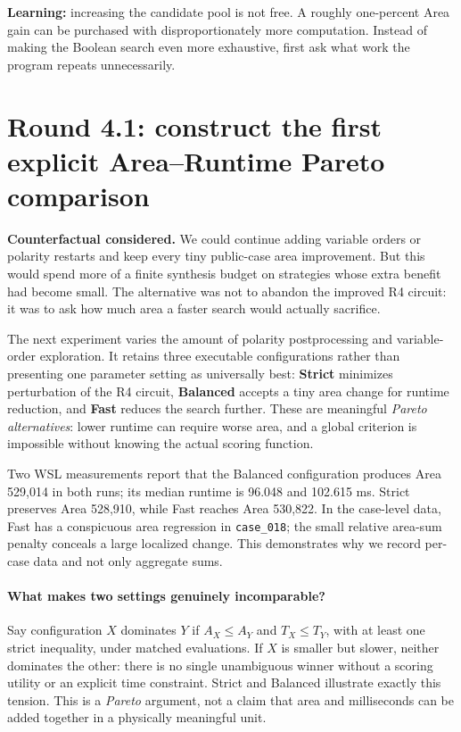\begin{tcolorbox}[colback=ResearchRose!20,colframe=ResearchRose,title=Decision after Round 4]
\textbf{Learning:} increasing the candidate pool is not free. A roughly one-percent Area gain can be purchased with disproportionately more computation. Instead of making the Boolean search even more exhaustive, first ask what work the program repeats unnecessarily.
\end{tcolorbox}

\section{Round 4.1: construct the first explicit Area--Runtime Pareto comparison}
\textbf{Counterfactual considered.} We could continue adding variable orders or polarity restarts and keep every tiny public-case area improvement. But this would spend more of a finite synthesis budget on strategies whose extra benefit had become small. The alternative was not to abandon the improved R4 circuit: it was to ask how much area a faster search would actually sacrifice.

The next experiment varies the amount of polarity postprocessing and variable-order exploration. It retains three executable configurations rather than presenting one parameter setting as universally best: \textbf{Strict} minimizes perturbation of the R4 circuit, \textbf{Balanced} accepts a tiny area change for runtime reduction, and \textbf{Fast} reduces the search further. These are meaningful \emph{Pareto alternatives}: lower runtime can require worse area, and a global criterion is impossible without knowing the actual scoring function.

Two WSL measurements report that the Balanced configuration produces Area 529,014 in both runs; its median runtime is 96.048 and 102.615 ms. Strict preserves Area 528,910, while Fast reaches Area 530,822. In the case-level data, Fast has a conspicuous area regression in \texttt{case\_018}; the small relative area-sum penalty conceals a large localized change. This demonstrates why we record per-case data and not only aggregate sums.

\paragraph{What makes two settings genuinely incomparable?} Say configuration $X$ dominates $Y$ if $A_X\le A_Y$ and $T_X\le T_Y$, with at least one strict inequality, under matched evaluations. If $X$ is smaller but slower, neither dominates the other: there is no single unambiguous winner without a scoring utility or an explicit time constraint. Strict and Balanced illustrate exactly this tension. This is a \emph{Pareto} argument, not a claim that area and milliseconds can be added together in a physically meaningful unit.

